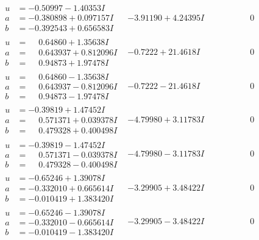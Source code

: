 \documentclass[1p]{elsarticle_modified}
\theoremstyle{definition}
\begin{document}
$$\begin{array}{c|c|c}
\begin{aligned}
u &= -0.50997 - 1.40353 I \\
a &= -0.380898 + 0.097157 I \\
b &= -0.392543 + 0.656583 I\end{aligned}
 & -3.91190 + 4.24395 I & \phantom{-0.000000 } 0 \\ \hline\begin{aligned}
u &= \phantom{-}0.64860 + 1.35638 I \\
a &= \phantom{-}0.643937 + 0.812096 I \\
b &= \phantom{-}0.94873 + 1.97478 I\end{aligned}
 & -0.7222 + 21.4618 I & \phantom{-0.000000 } 0 \\ \hline\begin{aligned}
u &= \phantom{-}0.64860 - 1.35638 I \\
a &= \phantom{-}0.643937 - 0.812096 I \\
b &= \phantom{-}0.94873 - 1.97478 I\end{aligned}
 & -0.7222 - 21.4618 I & \phantom{-0.000000 } 0 \\ \hline\begin{aligned}
u &= -0.39819 + 1.47452 I \\
a &= \phantom{-}0.571371 + 0.039378 I \\
b &= \phantom{-}0.479328 + 0.400498 I\end{aligned}
 & -4.79980 + 3.11783 I & \phantom{-0.000000 } 0 \\ \hline\begin{aligned}
u &= -0.39819 - 1.47452 I \\
a &= \phantom{-}0.571371 - 0.039378 I \\
b &= \phantom{-}0.479328 - 0.400498 I\end{aligned}
 & -4.79980 - 3.11783 I & \phantom{-0.000000 } 0 \\ \hline\begin{aligned}
u &= -0.65246 + 1.39078 I \\
a &= -0.332010 + 0.665614 I \\
b &= -0.010419 + 1.383420 I\end{aligned}
 & -3.29905 + 3.48422 I & \phantom{-0.000000 } 0 \\ \hline\begin{aligned}
u &= -0.65246 - 1.39078 I \\
a &= -0.332010 - 0.665614 I \\
b &= -0.010419 - 1.383420 I\end{aligned}
 & -3.29905 - 3.48422 I & \phantom{-0.000000 } 0\\

\end{array}$$
\end{document}
